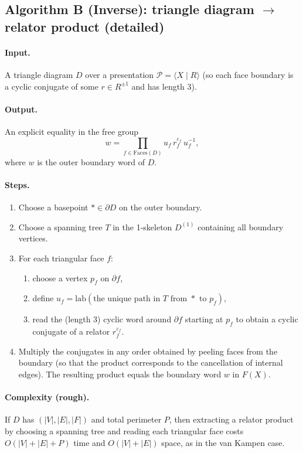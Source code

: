 \documentclass[11pt]{article}
\theoremstyle{definition}
\theoremstyle{plain}
\theoremstyle{remark}
\newcommand{\lab}{\mathrm{lab}}
\newcommand{\Faces}{\mathrm{Faces}}
\begin{document}
\subsection*{Algorithm B (Inverse): triangle diagram $\to$ relator product (detailed)}\cite{hatcher2002}
\paragraph{Input.} A triangle diagram $D$ over a presentation $\mathcal P=\langle X\mid R\rangle$ (so each face boundary is a cyclic conjugate of some $r\in R^{\pm1}$ and has length $3$).
\paragraph{Output.} An explicit equality in the free group
\[
w=\prod_{f\in \Faces(D)} u_f\, r_f^{\varepsilon_f}\,u_f^{-1},
\]
where $w$ is the outer boundary word of $D$.

\paragraph{Steps.}
\begin{enumerate}[leftmargin=2.2em]
\item Choose a basepoint $*\in \partial D$ on the outer boundary.
\item Choose a spanning tree $T$ in the 1-skeleton $D^{(1)}$ containing all boundary vertices.
\item For each triangular face $f$:
\begin{enumerate}[leftmargin=2em]
\item choose a vertex $p_f$ on $\partial f$,
\item define $u_f=\lab(\text{the unique path in }T\text{ from }*\text{ to }p_f)$,
\item read the (length $3$) cyclic word around $\partial f$ starting at $p_f$ to obtain a cyclic conjugate of a relator $r_f^{\varepsilon_f}$.
\end{enumerate}
\item Multiply the conjugates in any order obtained by peeling faces from the boundary (so that the product corresponds to the cancellation of internal edges).
The resulting product equals the boundary word $w$ in $F(X)$.
\end{enumerate}



\paragraph{Complexity (rough).}\cite{hatcher2002}
If $D$ has $(|V|,|E|,|F|)$ and total perimeter $P$, then extracting a relator product by choosing a spanning tree and reading each triangular face costs
$O(|V|+|E|+P)$ time and $O(|V|+|E|)$ space, as in the van Kampen case.
\end{document}
